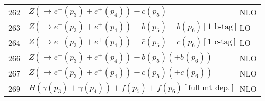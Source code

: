 \begin{table}
\begin{center}
\begin{tabular}{|l|l|l|}
262 & $ Z(\to e^-(p_{3})+e^+(p_{4}))+c(p_{5})$   & NLO \\
263 & $ Z(\to e^-(p_{3})+e^+(p_{4}))+\bar{b}(p_{5})+b(p_{6}) [\mbox{1 b-tag}]$   & LO \\
264 & $ Z(\to e^-(p_{3})+e^+(p_{4}))+\bar{c}(p_{5})+c(p_{6}) [\mbox{1 c-tag}]$   & LO \\
266 & $ Z(\to e^-(p_{3})+e^+(p_{4}))+b(p_{5})(+\bar{b}(p_{6}))$   & NLO \\
267 & $ Z(\to e^-(p_{3})+e^+(p_{4}))+c(p_{5})(+\bar{c}(p_{6}))$   & NLO \\
\hline 
269 & $ H(\gamma(p_{3})+\gamma(p_{4}))+f(p_{5})+f(p_{6}) [\mbox{full mt dep.}]$   & NLO \\
\hline 
\end{tabular}
\end{center}
\end{table}
\newpage
